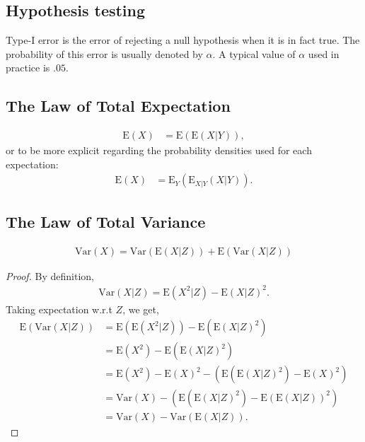 \documentclass{amsart}
\theoremstyle{plain}
\numberwithin{equation}{section}
\begin{document}
\subsection{Hypothesis testing}
Type-I error is the error of 
rejecting a null hypothesis when it 
is in fact true. The probability of this error
is usually denoted by $\alpha$. A typical 
value of $\alpha$ used in practice is 
$.05$.

\subsection{The Law of Total Expectation}
\begin{align*}
\mathrm{E}(X) &= \mathrm{E}(\mathrm{E}(X|Y)),
\end{align*}
or to be more explicit regarding the probability 
densities used for each expectation:
\begin{align*}
\mathrm{E}(X) &= \mathrm{E}_{Y}(\mathrm{E}_{X|Y}(X|Y)).
\end{align*}



\subsection{The Law of Total Variance}
\begin{align*}
\mathrm{Var}(X) = \mathrm{Var}(\mathrm{E}(X|Z))+
\mathrm{E}(\mathrm{Var}(X|Z)) 
\end{align*}

\begin{proof}
By definition,
\begin{align*}
\mathrm{Var}(X|Z) = \mathrm{E}(X^2|Z) - \mathrm{E}(X|Z)^2.
\end{align*}
Taking expectation w.r.t $Z$, we get,
\begin{align*}
\mathrm{E}(\mathrm{Var}(X|Z)) &= \mathrm{E}(\mathrm{E}(X^2|Z)) - \mathrm{E}(\mathrm{E}(X|Z)^2)\\
&= \mathrm{E}(X^2) - \mathrm{E}(\mathrm{E}(X|Z)^2)\\
&= \mathrm{E}(X^2) - \mathrm{E}(X)^2 - \left(\mathrm{E}(\mathrm{E}(X|Z)^2)-\mathrm{E}(X)^2\right)\\
&= \mathrm{Var}(X) - \left(\mathrm{E}(\mathrm{E}(X|Z)^2)-\mathrm{E}(\mathrm{E}(X|Z))^2\right)\\
&= \mathrm{Var}(X) - \mathrm{Var}(\mathrm{E}(X|Z)).
\end{align*}

\end{proof}
\end{document}
